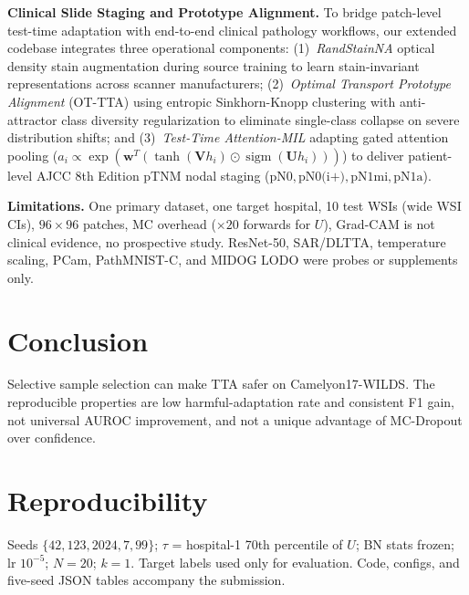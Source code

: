 \documentclass[conference]{IEEEtran}
\begin{document}
\textbf{Clinical Slide Staging and Prototype Alignment.} To bridge patch-level test-time adaptation with end-to-end clinical pathology workflows, our extended codebase integrates three operational components: (1)~\emph{RandStainNA} optical density stain augmentation during source training to learn stain-invariant representations across scanner manufacturers; (2)~\emph{Optimal Transport Prototype Alignment} (OT-TTA) using entropic Sinkhorn-Knopp clustering with anti-attractor class diversity regularization to eliminate single-class collapse on severe distribution shifts; and (3)~\emph{Test-Time Attention-MIL} adapting gated attention pooling ($a_i \propto \exp(\mathbf{w}^T(\tanh(\mathbf{V}h_i)\odot\operatorname{sigm}(\mathbf{U}h_i)))$) to deliver patient-level AJCC 8th Edition pTNM nodal staging ($\text{pN0}, \text{pN0(i+)}, \text{pN1mi}, \text{pN1a}$).

\textbf{Limitations.} One primary dataset, one target hospital, 10 test WSIs (wide WSI CIs), $96{\times}96$ patches, MC overhead (${\times}20$ forwards for $U$), Grad-CAM is not clinical evidence, no prospective study.
ResNet-50, SAR/DLTTA, temperature scaling, PCam, PathMNIST-C, and MIDOG LODO were probes or supplements only.

\section{Conclusion}
Selective sample selection can make TTA safer on Camelyon17-WILDS.
The reproducible properties are low harmful-adaptation rate and consistent F1 gain, not universal AUROC improvement, and not a unique advantage of MC-Dropout over confidence.

\section*{Reproducibility}
Seeds $\{42,123,2024,7,99\}$; $\tau$ = hospital-1 70th percentile of $U$; BN stats frozen; lr $10^{-5}$; $N{=}20$; $k{=}1$.
Target labels used only for evaluation.
Code, configs, and five-seed JSON tables accompany the submission.




\appendix
\end{document}
